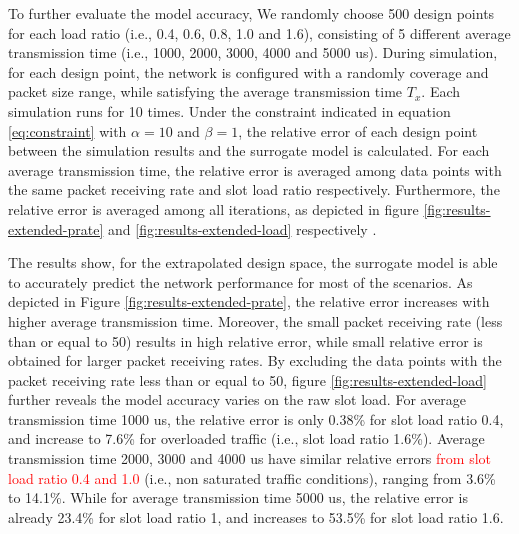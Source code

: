 To further evaluate the model accuracy, We randomly choose 500 design points for each load ratio (i.e., 0.4, 0.6, 0.8, 1.0 and 1.6), consisting of 5 different average transmission time (i.e., 1000, 2000, 3000, 4000 and 5000 us). During simulation, for each design point, the network is configured with a randomly coverage and packet size range, while satisfying the average transmission time $T_x$. Each simulation runs for 10 times.
Under the constraint indicated in equation \ref{eq:constraint} with $\alpha=10$ and $\beta=1$, the relative error of each design point between the simulation results and the surrogate model is calculated. For each average transmission time, the relative error is averaged among data points with the same packet receiving rate and slot load ratio respectively. Furthermore, the relative error is averaged among all iterations, as depicted in figure \ref{fig:results-extended-prate}   and \ref{fig:results-extended-load} respectively . 

The results show, for the extrapolated design space, the surrogate model is able to accurately predict the network performance for most of the scenarios. As depicted in Figure \ref{fig:results-extended-prate}, the relative error increases with higher average transmission time. Moreover, the small packet receiving rate (less than or equal to 50) results in high relative error, while small relative error is obtained for larger packet receiving rates. By excluding the data points with the packet receiving rate less than or equal to 50, figure \ref{fig:results-extended-load} further reveals the model accuracy varies on the \gls{raw} slot load. For average transmission time 1000 us, the relative error is only 0.38\% for slot load ratio 0.4, and increase to 7.6\% for overloaded traffic (i.e., slot load ratio 1.6\%). Average transmission time 2000, 3000 and 4000 us have similar relative errors \textcolor{red}{from slot load ratio 0.4 and 1.0} (i.e., non saturated traffic conditions), ranging from 3.6\% to 14.1\%. While for average transmission time 5000 us, the relative error is already 23.4\% for slot load ratio 1, and increases to 53.5\% for slot load ratio 1.6.






